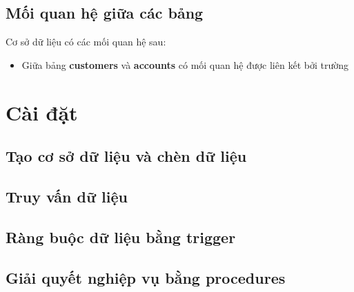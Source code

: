\documentclass[a4paper, 12pt]{report}
\begin{document}


\section{Mối quan hệ giữa các bảng}

Cơ sở dữ liệu có các mối quan hệ sau:

\begin{itemize}[leftmargin=2cm]
    \item Giữa bảng \textbf{customers} và \textbf{accounts} có mối quan hệ được liên kết bởi trường
\end{itemize}

\chapter{Cài đặt}

\section{Tạo cơ sở dữ liệu và chèn dữ liệu}



\section{Truy vấn dữ liệu}

\section{Ràng buộc dữ liệu bằng trigger}

\section{Giải quyết nghiệp vụ bằng procedures}
\end{document}
